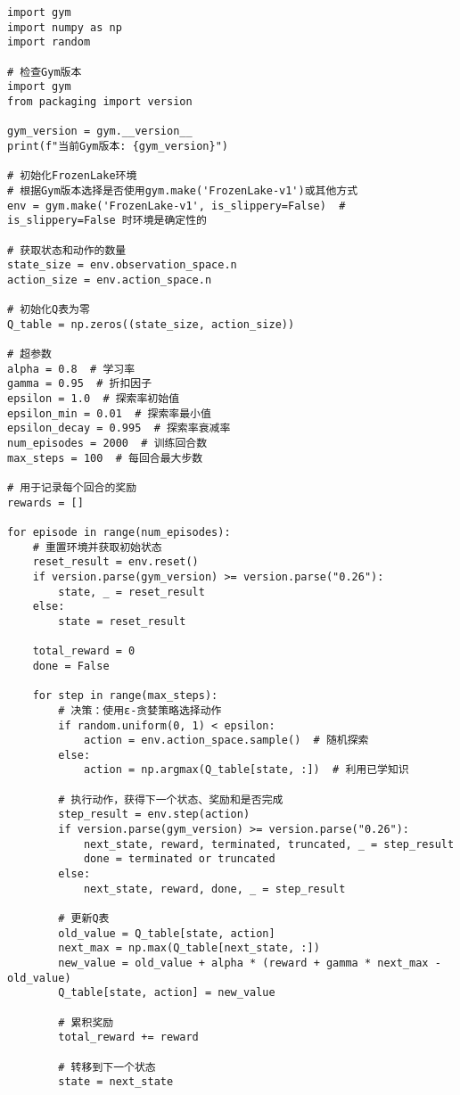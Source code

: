 \begin{lstlisting}
import gym
import numpy as np
import random

# 检查Gym版本
import gym
from packaging import version

gym_version = gym.__version__
print(f"当前Gym版本: {gym_version}")

# 初始化FrozenLake环境
# 根据Gym版本选择是否使用gym.make('FrozenLake-v1')或其他方式
env = gym.make('FrozenLake-v1', is_slippery=False)  # is_slippery=False 时环境是确定性的

# 获取状态和动作的数量
state_size = env.observation_space.n
action_size = env.action_space.n

# 初始化Q表为零
Q_table = np.zeros((state_size, action_size))

# 超参数
alpha = 0.8  # 学习率
gamma = 0.95  # 折扣因子
epsilon = 1.0  # 探索率初始值
epsilon_min = 0.01  # 探索率最小值
epsilon_decay = 0.995  # 探索率衰减率
num_episodes = 2000  # 训练回合数
max_steps = 100  # 每回合最大步数

# 用于记录每个回合的奖励
rewards = []

for episode in range(num_episodes):
    # 重置环境并获取初始状态
    reset_result = env.reset()
    if version.parse(gym_version) >= version.parse("0.26"):
        state, _ = reset_result
    else:
        state = reset_result

    total_reward = 0
    done = False

    for step in range(max_steps):
        # 决策：使用ε-贪婪策略选择动作
        if random.uniform(0, 1) < epsilon:
            action = env.action_space.sample()  # 随机探索
        else:
            action = np.argmax(Q_table[state, :])  # 利用已学知识

        # 执行动作，获得下一个状态、奖励和是否完成
        step_result = env.step(action)
        if version.parse(gym_version) >= version.parse("0.26"):
            next_state, reward, terminated, truncated, _ = step_result
            done = terminated or truncated
        else:
            next_state, reward, done, _ = step_result

        # 更新Q表
        old_value = Q_table[state, action]
        next_max = np.max(Q_table[next_state, :])
        new_value = old_value + alpha * (reward + gamma * next_max - old_value)
        Q_table[state, action] = new_value

        # 累积奖励
        total_reward += reward

        # 转移到下一个状态
        state = next_state


\end{lstlisting}

